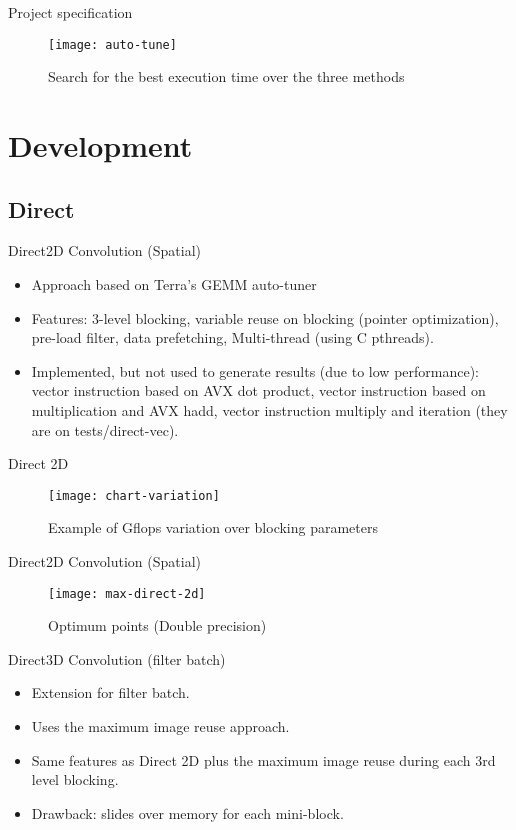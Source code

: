 \begin{frame}{Project specification}
 \begin{figure}[ht] \label{fig1} 
\texttt{[image: auto-tune]}
 \caption{Search for the best execution time over the three methods} 
\end{figure}
\end{frame}

\section{Development}

\subsection{Direct}

\begin{frame}{Direct}{2D Convolution (Spatial)}

  \begin{itemize}
  \item {
   Approach based on Terra's GEMM auto-tuner
  }
   \item {   
    Features: 3-level blocking, variable reuse on blocking (pointer optimization), pre-load filter, data prefetching, Multi-thread (using C pthreads).
  }
   \item {   
    Implemented, but not used to generate results (due to low performance): vector instruction based on AVX dot product, vector instruction based on multiplication and AVX hadd, vector instruction multiply and iteration (they are on tests/direct-vec).
  }
  \end{itemize}
\end{frame}

\begin{frame}{Direct 2D}
\begin{figure}[ht] \label{fig1} 
\texttt{[image: chart-variation]}
 \caption{Example of Gflops variation over blocking parameters} 
\end{figure}
\end{frame}

\begin{frame}{Direct}{2D Convolution (Spatial)}
    \begin{figure}[ht] \label{fig1} 
        \texttt{[image: max-direct-2d]}
        \caption{Optimum points (Double precision)} 
    \end{figure}
\end{frame}
\begin{frame}{Direct}{3D Convolution (filter batch)}
  \begin{itemize}
  \item {
   Extension for filter batch.
  }
  \item {
   Uses the maximum image reuse approach.
  }
   \item {   
    Same features as Direct 2D plus the maximum image reuse during each 3rd level blocking.
  }
  \item {   
    Drawback: slides over memory for each mini-block.
  }
  \end{itemize}
\end{frame}


